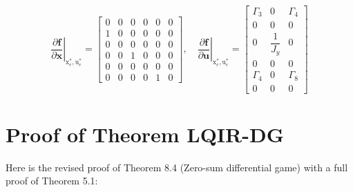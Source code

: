 \documentclass[3p]{elsarticle}
\begin{document}
\begin{equation}
    \left.\dfrac{\partial \mathbf{f}}{\partial \mathbf{x}}\right|_{\boldsymbol{{\mathrm{x}}}_e^*, \boldsymbol{{\mathrm{u}}}_e^*} = \begin{bmatrix}
        0 & 0 & 0 & 0 & 0 & 0 \\
        1 & 0 & 0 & 0 & 0 & 0 \\
        0 & 0 & 0 & 0 & 0 & 0 \\
        0 & 0 & 1 & 0 & 0 & 0 \\
        0 & 0 & 0 & 0 & 0 & 0 \\
        0 & 0 & 0 & 0 & 1 & 0
    \end{bmatrix}, \quad \left.\dfrac{\partial \mathbf{f}}{\partial \mathbf{u}}\right|_{\boldsymbol{{\mathrm{x}}}_e^*, \boldsymbol{{\mathrm{u}}}_e^*} = \begin{bmatrix}
        \Gamma_3 & 0 & \Gamma_4 \\
        0 & 0 & 0 \\
        0 & \dfrac{1}{J_y} & 0 \\
        0 & 0 & 0 \\
        \Gamma_4 & 0 & \Gamma_8 \\
        0 & 0 & 0
    \end{bmatrix}
\end{equation}

\section{Proof of Theorem LQIR-DG}
\label{appendix:proof_LQIR-DG}
Here is the revised proof of Theorem 8.4 (Zero-sum differential game) with a full proof of Theorem 5.1:
\end{document}

